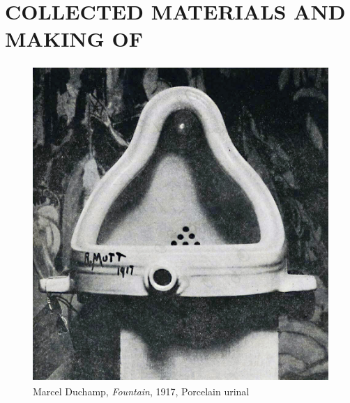 \chapter{COLLECTED MATERIALS AND MAKING OF}

\begin{figure}[h!]
  \centering
  \includegraphics[height=12cm]{graphics/Duchamp_Fountaine.jpg}
  \caption{Marcel Duchamp, \textit{Fountain}, 1917, Porcelain urinal}
  \label{fig:Duchamp_Fountaine1}
\end{figure}


